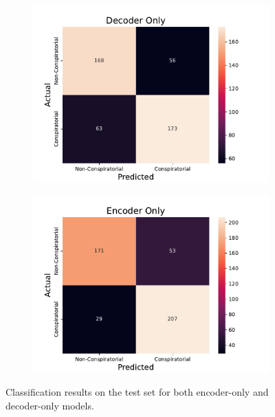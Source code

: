 \documentclass[11pt]{article}
\begin{document}
\begin{figure}
    \centering
    \begin{subfigure}{\columnwidth}
        \centering
        \includegraphics[width=\textwidth]{figures/decoder-only-confusion-matrix.pdf}
    \end{subfigure}
    \begin{subfigure}{\columnwidth}
        \centering
        \includegraphics[width=\textwidth]{figures/encoder-only-confusion-matrix.pdf}
    \end{subfigure}
    \caption{Classification results on the test set for both encoder-only and decoder-only models.}
    \label{fig:confusion-matrix}
\end{figure}






\end{document}
